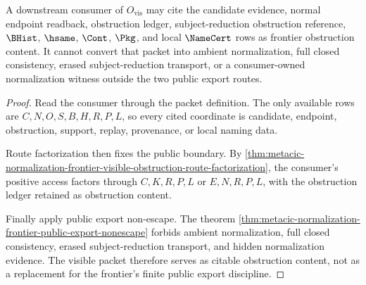 \begin{theorem}
\label{thm:metacic-normalization-frontier-visible-obstruction-consumer-nonescape}
A downstream consumer of $O_{\mathrm{vis}}$ may cite the candidate evidence,
normal endpoint readback, obstruction ledger, subject-reduction obstruction
reference, $\BHist$, $\hsame$, $\Cont$, $\Pkg$, and local $\NameCert$ rows as
frontier obstruction content. It cannot convert that packet into ambient
normalization, full closed consistency, erased subject-reduction transport, or
a consumer-owned normalization witness outside the two public export routes.
\end{theorem}
\begin{proof}
Read the consumer through the packet definition. The only available rows are
$C,N,O,S,B,H,R,P,L$, so every cited coordinate is candidate, endpoint,
obstruction, support, replay, provenance, or local naming data.

Route factorization then fixes the public boundary. By
\autoref{thm:metacic-normalization-frontier-visible-obstruction-route-factorization},
the consumer's positive access factors through $C,K,R,P,L$ or $E,N,R,P,L$,
with the obstruction ledger retained as obstruction content.

Finally apply public export non-escape. The theorem
\autoref{thm:metacic-normalization-frontier-public-export-nonescape} forbids
ambient normalization, full closed consistency, erased subject-reduction
transport, and hidden normalization evidence. The visible packet therefore
serves as citable obstruction content, not as a replacement for the frontier's
finite public export discipline.
\end{proof}
